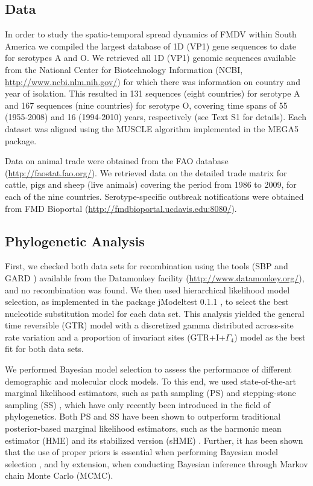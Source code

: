 \documentclass[10pt]{article}
\begin{document}
\subsection*{Data}

In order to study the spatio-temporal spread dynamics of FMDV within South America we compiled the largest database of 1D (VP1) gene sequences to date for serotypes A and O.
We retrieved all 1D (VP1) genomic sequences available from the National Center for Biotechnology Information (NCBI, \url{ http://www.ncbi.nlm.nih.gov/}) for which there was information on country and year of isolation.
This resulted in 131 sequences (eight countries) for serotype A and 167 sequences (nine countries) for serotype O, covering time spans of 55 (1955-2008) and 16 (1994-2010) years, respectively (see Text S1 for details).
Each dataset was aligned using the MUSCLE algorithm implemented in the MEGA5 \cite{MEGA} package.

Data on animal trade were obtained from the FAO database (\url{http://faostat.fao.org/}).
We retrieved data on the detailed trade matrix for cattle, pigs and sheep (live animals) covering the period from 1986 to 2009, for each of the nine countries.
Serotype-specific outbreak notifications were obtained from FMD Bioportal (\url{http://fmdbioportal.ucdavis.edu:8080/}).


\subsection*{Phylogenetic Analysis}

First, we checked both data sets for recombination using the tools (SBP and GARD \cite{sbpgard}) available from the Datamonkey facility (\url{http://www.datamonkey.org/}), and no recombination was found.
We then used hierarchical likelihood model selection, as implemented in the package jModeltest 0.1.1 \cite{jmodel}, to select the best nucleotide substitution model for each data set.
This analysis yielded the general time reversible (GTR) model with a discretized gamma distributed across-site rate variation and a proportion of invariant sites (GTR+I+$\Gamma_{4}$) model as the best fit for both data sets.

We performed Bayesian model selection to assess the performance of different demographic and molecular clock models.
To this end, we used state-of-the-art marginal likelihood estimators, such as path sampling (PS) \cite{LartillotPhilippe} and stepping-stone sampling (SS) \cite{Xie}, which have only recently been introduced in the field of phylogenetics.
Both PS and SS have been shown to outperform traditional posterior-based marginal likelihood estimators, such as the harmonic mean estimator (HME) and its stabilized version (sHME) \cite{LartillotPhilippe,Xie,Baele2012,Baele2013a,Baele2013b}.
Further, it has been shown that the use of proper priors is essential when performing Bayesian model selection \cite{Baele2013a}, and by extension, when conducting Bayesian inference through Markov chain Monte Carlo (MCMC).
                                                                       
\end{document}
